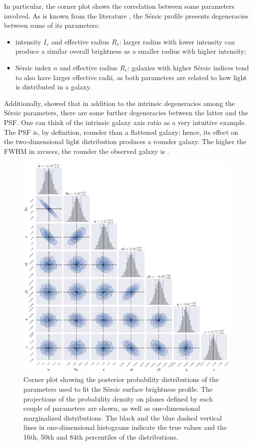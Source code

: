 In particular, the corner plot shows the correlation between some parameters involved. As is known from the literature \citep{graham_concise_2005,ciotti_analytical_1999}, the Sérsic profile presents degeneracies between some of its parameters:
\begin{itemize}
    \item intensity $I_e$ and effective radius $R_e$: larger radius with lower intensity can produce a similar overall brightness as a smaller radius with higher intensity;
    \item Sérsic index $n$ and effective radius $R_e$: galaxies with higher Sérsic indices tend to also have larger effective radii, as both parameters are related to how light is distributed in a galaxy.
\end{itemize}
Additionally, \cite{trujillo_effects_2001,trujillo_effects_2001-1} showed that in addition to the intrinsic degeneracies among the Sérsic parameters, there are some further degeneracies between the latter and the PSF. One can think of the intrinsic galaxy axis ratio as a very intuitive example. The PSF is, by definition, rounder than a flattened galaxy; hence, its effect on the two-dimensional light distribution produces a rounder galaxy. The higher the FWHM in arcsecs, the rounder the observed galaxy is \citep{peng_detailed_2002,li_galaxy_2022}.

\begin{figure}
    \centering
    \includegraphics[width=\linewidth]{img//chapter5//sersic/corner_sersic.png}
    \caption[Corner plot Sérsic profile]{Corner plot showing the posterior probability distributions of the parameters used to fit the Sérsic surface brightness profile. The projections of the probability density on planes defined by each couple of parameters are shown, as well as one-dimensional marginalized distributions. The black and the blue dashed vertical lines in one-dimensional histograms indicate the true values and the 16th, 50th and 84th percentiles of the distributions.}
    \label{fig:corner_sersic}
\end{figure}